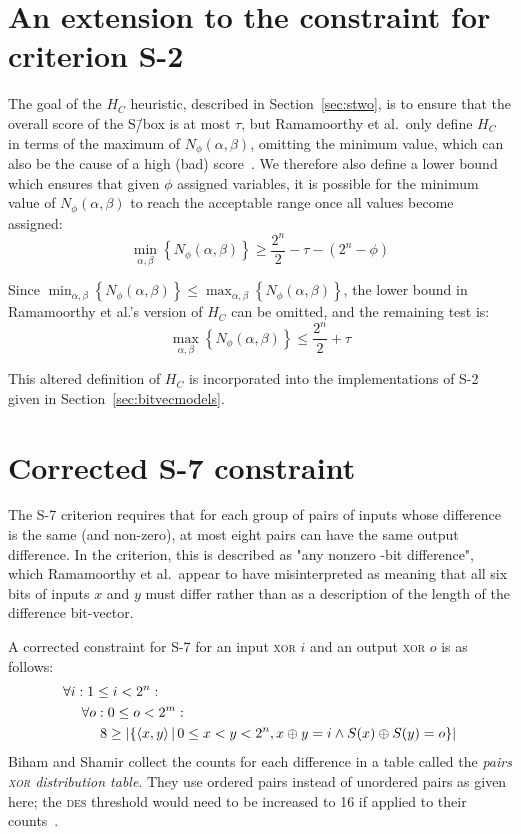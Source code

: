 \documentclass[a4paper,10pt,twoside,openright]{book}
\renewcommand{\sc}[1]{\textsc{\lowercase{#1}}}
\renewcommand{\ln}[1]{{\fontsize{8pt}{8pt}\selectfont#1}}
\newcommand{\set}[1]{\left\{#1\right\}}
\newcommand{\suchthat}{\,\middle|\,}
\newcommand{\tuple}[1]{\left\langle #1\right\rangle}
\newcommand{\Nphi}{N_\phi(\alpha,\beta)}
\DeclarePairedDelimiter\Cardinality{\lvert}{\rvert}%
\begin{document}
\section{An extension to the constraint for criterion S-2}
\label{sec:stwoupdate}
The goal of the $H_C$ heuristic, described in Section~\ref{sec:stwo},
is to ensure that the overall score of the S\=/box is at most $\tau$, but Ramamoorthy et al.\ only 
define $H_C$ in terms of the maximum of $\Nphi$, omitting the minimum value, which can also
be the cause of a high (bad) score~\cite{sboxes}. 
We therefore also define a lower bound which ensures that given $\phi$ assigned variables, 
it is possible for the minimum value of $\Nphi$ to reach the acceptable range once all values become assigned:
\[\min_{\alpha,\beta}\left\{\Nphi\right\} \geq \frac{2^{n}}{2} - \tau - (2^n - \phi)\]

Since $\min_{\alpha,\beta}\left\{\Nphi\right\} \leq \max_{\alpha,\beta}\left\{\Nphi\right\}$, 
the lower bound in Ramamoorthy et al.'s version of $H_C$ can be omitted, and the remaining test is:
\[\max_{\alpha,\beta}\left\{\Nphi\right\} \leq \frac{2^n}{2} + \tau\]

This altered definition of $H_C$ is incorporated into the implementations of S-2 given in Section~\ref{sec:bitvecmodels}.

\section{Corrected S-7 constraint}
\label{sec:ssevenfix}
The S-7 criterion requires that for each group of pairs of inputs whose difference is the same (and non-zero), at most eight pairs can have the same output difference. In the criterion, this is described as "any nonzero \ln{6}-bit difference", which Ramamoorthy et al.\ appear to have misinterpreted as meaning that all six bits of inputs $x$ and $y$ must differ rather than as a description of the length of the difference bit-vector.

A corrected constraint for S-7 for an input \sc{XOR} $i$ and an output \sc{XOR} $o$ is as follows:
\begin{align*}
    & \forall i : 1 \leq i < 2^n : \\
    & ~~~~ \forall o : 0 \leq o < 2^m : \\
    & ~~~~~~~~ %
    8 \geq
    \Cardinality{
        \set{
            \tuple{x,y}
            \suchthat
            0 \leq x < y < 2^n,
            x \oplus y = i \land
            S(x) \oplus S(y) = o
        }
    } 
\end{align*}
Biham and Shamir collect the counts for each difference in a table called the \textit{pairs \sc{xor} distribution table}.
They use ordered pairs instead of unordered pairs as given here; the \sc{DES} threshold would need to be increased to 16 if applied to their counts~\cite{biham}.
\end{document}

